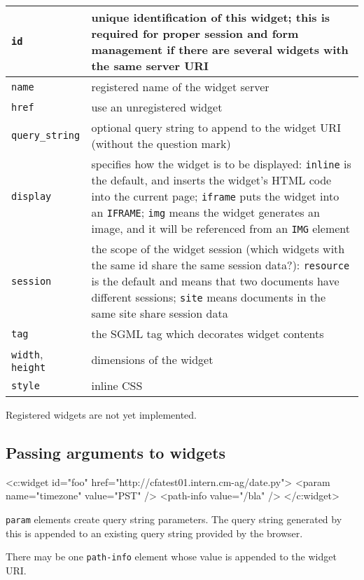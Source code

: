 \documentclass[a4paper,12pt]{article}
\begin{document}
\begin{tabular}{|l|p{8cm}|}
\hline
\texttt{id} & unique identification of this widget; this is required
for proper session and form management if there are several widgets
with the same server URI \\
\hline
\texttt{name} & registered name of the widget server \\
\hline
\texttt{href} & use an unregistered widget \\
\hline
\texttt{query\_string} & optional query string to append to the widget
URI (without the question mark) \\
\hline
\texttt{display} & specifies how the widget is to be displayed:
\texttt{inline} is the default, and inserts the widget's HTML code
into the current page; \texttt{iframe} puts the widget into an
\texttt{IFRAME}; \texttt{img} means the widget generates an image, and
it will be referenced from an \texttt{IMG} element \\
\hline
\texttt{session} & the scope of the widget session (which widgets with
the same id share the same session data?): \texttt{resource} is the
default and means that two documents have different sessions;
\texttt{site} means documents in the same site share session data \\
\hline
\texttt{tag} & the SGML tag which decorates widget contents \\
\hline
\texttt{width}, \texttt{height} & dimensions of the widget \\
\hline
\texttt{style} & inline CSS \\
\hline
\end{tabular}

Registered widgets are not yet implemented.

\subsection{Passing arguments to widgets}

\begin{verbatim*}
<c:widget id="foo" href="http://cfatest01.intern.cm-ag/date.py">
  <param name="timezone" value="PST" />
  <path-info value="/bla" />
</c:widget>
\end{verbatim*}

\texttt{param} elements create query string parameters.  The query
string generated by this is appended to an existing query string
provided by the browser.

There may be one \texttt{path-info} element whose value is appended to
the widget URI.
\end{document}
